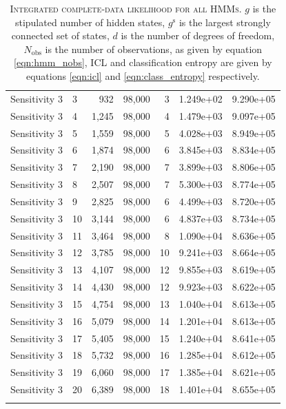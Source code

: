 \begin{xltabular}{\linewidth}{llrrrrr}
 Sensitivity 3 & 3 & 932 &  98,000 &   3 & 1.249e+02 & 9.290e+05 \\
 Sensitivity 3 & 4 & 1,245 &  98,000 &   4 & 1.479e+03 & 9.097e+05 \\
 Sensitivity 3 & 5 & 1,559 &  98,000 &   5 & 4.028e+03 & 8.949e+05 \\
 Sensitivity 3 & 6 & 1,874 &  98,000 &   6 & 3.845e+03 & 8.834e+05 \\
 Sensitivity 3 & 7 & 2,190 &  98,000 &   7 & 3.899e+03 & 8.806e+05 \\
 Sensitivity 3 & 8 & 2,507 &  98,000 &   7 & 5.300e+03 & 8.774e+05 \\
 Sensitivity 3 & 9 & 2,825 &  98,000 &   6 & 4.499e+03 & 8.720e+05 \\
 Sensitivity 3 & 10 & 3,144 &  98,000 &   6 & 4.837e+03 & 8.734e+05 \\
 Sensitivity 3 & 11 & 3,464 &  98,000 &   8 & 1.090e+04 & 8.636e+05 \\
 Sensitivity 3 & 12 & 3,785 &  98,000 &   10 & 9.241e+03 & 8.664e+05 \\
 Sensitivity 3 & 13 & 4,107 &  98,000 &   12 & 9.855e+03 & 8.619e+05 \\
 Sensitivity 3 & 14 & 4,430 &  98,000 &   12 & 9.923e+03 & 8.622e+05 \\
 Sensitivity 3 & 15 & 4,754 &  98,000 &   13 & 1.040e+04 & 8.613e+05 \\
 Sensitivity 3 & 16 & 5,079 &  98,000 &   14 & 1.201e+04 & 8.613e+05 \\
 Sensitivity 3 & 17 & 5,405 &  98,000 &   15 & 1.240e+04 & 8.641e+05 \\
 Sensitivity 3 & 18 & 5,732 &  98,000 &   16 & 1.285e+04 & 8.612e+05 \\
 Sensitivity 3 & 19 & 6,060 &  98,000 &   17 & 1.385e+04 & 8.621e+05 \\
 Sensitivity 3 & 20 & 6,389 &  98,000 &   18 & 1.401e+04 & 8.655e+05 \\
 \bottomrule
  \caption[Integrated complete-data likelihood for all HMMs]{\textsc{Integrated complete-data  likelihood for all HMMs}. $g$ is the stipulated number of hidden states, $g^{\mathrm{s}}$ is the  largest strongly connected set of states, $d$ is the number of degrees of freedom,  $N_{\mathrm{obs}}$ is the number of observations, as given by equation \ref{eqn:hmm_nobs}, ICL and classification entropy are given by equations \ref{eqn:icl} and \ref{eqn:class_entropy}  respectively. }\label{tab:aadh_h_state_selection}
\end{xltabular}



